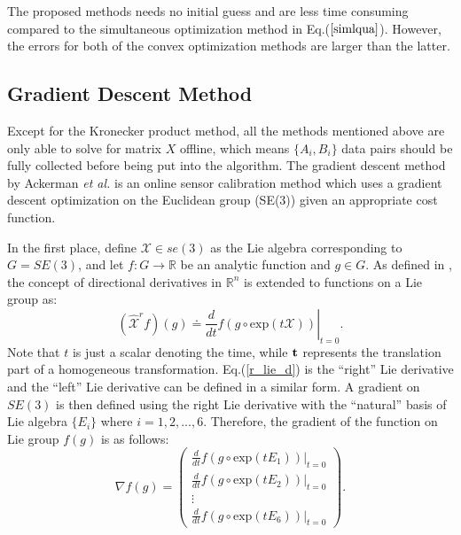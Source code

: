 \documentclass[twocolumn,10pt]{asme2ej}
\newcommand{\ttt}{{\bf t}}
\begin{document}
The proposed methods needs no initial guess and are less time consuming compared to  the simultaneous optimization method in Eq.($\ref{simlqua}$). However, the errors for both of the convex optimization methods are larger than the latter. 
\subsection{Gradient Descent Method}
Except for the Kronecker product method, all the methods mentioned above are only able to solve for matrix $X$ offline, which means $\{A_{i}, B_{i}\}$ data pairs should be fully collected before being put into the algorithm. The gradient descent method \cite{ackerman2014online} by Ackerman {\it et al.} is an online sensor calibration method which uses a gradient descent optimization on the Euclidean group (SE(3)) given an appropriate cost function. 

In the first place, define $\mathcal{X} \in se(3)$ as the Lie algebra corresponding to $G = SE(3)$, and let $f:G \rightarrow \mathbb{R}$ be an analytic function and $g \in G$. As defined in \cite{myoldbook}, the concept of directional derivatives in $\mathbb{R}^{n}$ is extended to functions on a Lie group as:
\begin{equation}
\left.(\hat{\mathcal{X}}^{r}f)(g)\doteq \dfrac{d}{dt}f(g\circ \text{exp}(t\mathcal{X}))\right\vert_{t=0}.
\label{r_lie_d}
\end{equation}
Note that $t$ is just a scalar denoting the time, while $\ttt$ represents the translation part of a homogeneous transformation.
Eq.(\ref{r_lie_d}) is the ``right'' Lie derivative and the ``left'' Lie derivative can be defined in a similar form. A gradient on $SE(3)$ is then defined using the right Lie derivative with the ``natural'' basis of Lie algebra $\{E_{i}\}$ where $i = 1,2,...,6$. Therefore, the gradient of the function on Lie group $f(g)$ is as follows:
\begin{equation}
\nabla f(g)= \left( 
\begin{matrix}
\frac{d}{dt}\left.f(g\circ \text{exp}(tE_{1}))\right\vert _{t=0} \\
\frac{d}{dt}\left.f(g\circ \text{exp}(tE_{2}))\right\vert _{t=0} \\
\vdots \\
\frac{d}{dt}\left.f(g\circ \text{exp}(tE_{6}))\right\vert _{t=0}
\end{matrix}
\right).
\end{equation}
\end{document}
